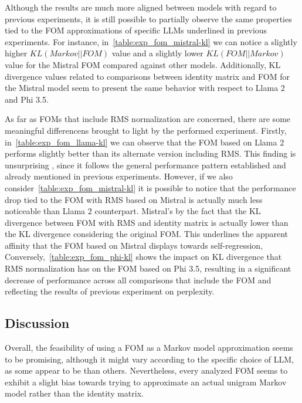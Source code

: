 Although the results are much more aligned between models with regard to previous experiments, it is still possible to partially observe the same properties tied to the FOM approximations of specific LLMs underlined in previous experiments.
For instance, in~\cref{table:exp_fom_mistral-kl} we can notice a slightly higher $KL(Markov||FOM)$  value and a slightly lower $KL(FOM||Markov)$  value for the Mistral FOM compared against other models.
Additionally, KL divergence values related to comparisons between identity matrix and FOM for the Mistral model seem to present the same behavior with respect to Llama 2 and Phi 3.5.

As far as FOMs that include RMS normalization are concerned, there are some meaningful differencens brought to light by the performed experiment.
Firstly, in~\cref{table:exp_fom_llama-kl} we can observe that the FOM based on Llama 2 performs slightly better than its alternate version including RMS\@.
This finding is unsurprising , since it follows the general performance pattern established and already mentioned in previous experiments.
However, if we also consider~\cref{table:exp_fom_mistral-kl} it is possible to notice that the performance drop tied to the FOM with RMS based on Mistral is actually much less noticeable than  Llama 2 counterpart.
Mistral's  by the fact that the KL divergence between FOM with RMS and identity matrix is actually lower than the KL divergence considering the original FOM\@.
This underlines the apparent affinity that the FOM based on Mistral displays towards self-regression,
Conversely,~\cref{table:exp_fom_phi-kl} shows the  impact on KL divergence that RMS normalization has on the FOM based  on Phi 3.5, resulting in a significant decrease of performance across all comparisons that include the FOM and reflecting the results of  previous experiment on perplexity.

\subsection{Discussion}\label{ssec:exp_fom_discussion}

Overall, the feasibility of using a FOM as a Markov model approximation seems to be promising, although it might vary according to the specific choice of LLM, as some appear to be  than others.
Nevertheless, every analyzed FOM seems to exhibit a slight bias towards trying to approximate an actual unigram Markov model rather than the identity matrix.

